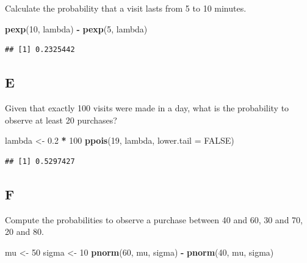 \documentclass[
]{article}
\newenvironment{Shaded}{\begin{snugshade}}{\end{snugshade}}
\newcommand{\DataTypeTok}[1]{\textcolor[rgb]{0.13,0.29,0.53}{#1}}
\newcommand{\DecValTok}[1]{\textcolor[rgb]{0.00,0.00,0.81}{#1}}
\newcommand{\FloatTok}[1]{\textcolor[rgb]{0.00,0.00,0.81}{#1}}
\newcommand{\KeywordTok}[1]{\textcolor[rgb]{0.13,0.29,0.53}{\textbf{#1}}}
\newcommand{\NormalTok}[1]{#1}
\newcommand{\OperatorTok}[1]{\textcolor[rgb]{0.81,0.36,0.00}{\textbf{#1}}}
\newcommand{\OtherTok}[1]{\textcolor[rgb]{0.56,0.35,0.01}{#1}}
\newcommand{\StringTok}[1]{\textcolor[rgb]{0.31,0.60,0.02}{#1}}
\begin{document}
Calculate the probability that a visit lasts from 5 to 10 minutes.

\begin{Shaded}
\begin{Highlighting}[]
\KeywordTok{pexp}\NormalTok{(}\DecValTok{10}\NormalTok{, lambda) }\OperatorTok{{-}}\StringTok{ }\KeywordTok{pexp}\NormalTok{(}\DecValTok{5}\NormalTok{, lambda)}
\end{Highlighting}
\end{Shaded}

\begin{verbatim}
## [1] 0.2325442
\end{verbatim}

\hypertarget{e}{%
\subsection{E}\label{e}}

Given that exactly 100 visits were made in a day, what is the
probability to observe at least 20 purchases?

\begin{Shaded}
\begin{Highlighting}[]
\NormalTok{lambda \textless{}{-}}\StringTok{ }\FloatTok{0.2} \OperatorTok{*}\StringTok{ }\DecValTok{100}
\KeywordTok{ppois}\NormalTok{(}\DecValTok{19}\NormalTok{, lambda, }\DataTypeTok{lower.tail =} \OtherTok{FALSE}\NormalTok{)}
\end{Highlighting}
\end{Shaded}

\begin{verbatim}
## [1] 0.5297427
\end{verbatim}

\hypertarget{f}{%
\subsection{F}\label{f}}

Compute the probabilities to observe a purchase between 40 and 60, 30
and 70, 20 and 80.

\begin{Shaded}
\begin{Highlighting}[]
\NormalTok{mu \textless{}{-}}\StringTok{ }\DecValTok{50}
\NormalTok{sigma \textless{}{-}}\StringTok{ }\DecValTok{10}
\KeywordTok{pnorm}\NormalTok{(}\DecValTok{60}\NormalTok{, mu, sigma) }\OperatorTok{{-}}\StringTok{ }\KeywordTok{pnorm}\NormalTok{(}\DecValTok{40}\NormalTok{, mu, sigma)}
\end{Highlighting}
\end{Shaded}
\end{document}
